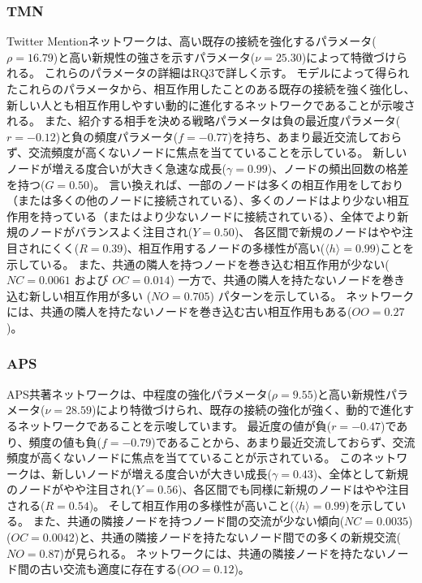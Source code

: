 \documentclass[uplatex,11pt,openany]{ujreport}
\begin{document}
            \subsubsection*{TMN}
            Twitter Mentionネットワークは、高い既存の接続を強化するパラメータ($\rho = 16.79$)と高い新規性の強さを示すパラメータ($\nu = 25.30$)によって特徴づけられる。
            これらのパラメータの詳細はRQ3で詳しく示す。
            モデルによって得られたこれらのパラメータから、相互作用したことのある既存の接続を強く強化し、新しい人とも相互作用しやすい動的に進化するネットワークであることが示唆される。
            また、紹介する相手を決める戦略パラメータは負の最近度パラメータ($r = -0.12$)と負の頻度パラメータ($f = -0.77$)を持ち、あまり最近交流しておらず、交流頻度が高くないノードに焦点を当てていることを示している。
            新しいノードが増える度合いが大きく急速な成長($\gamma = 0.99$)、ノードの頻出回数の格差を持つ($G = 0.50$)。
            言い換えれば、一部のノードは多くの相互作用をしており（または多くの他のノードに接続されている）、多くのノードはより少ない相互作用を持っている（またはより少ないノードに接続されている）、全体でより新規のノードがバランスよく注目され($Y = 0.50$)、
            各区間で新規のノードはやや注目されにくく($R = 0.39$)、相互作用するノードの多様性が高い($\langle h \rangle = 0.99$)ことを示している。
            また、共通の隣人を持つノードを巻き込む相互作用が少ない($NC = 0.0061$ および $OC = 0.014$) 一方で、共通の隣人を持たないノードを巻き込む新しい相互作用が多い ($NO = 0.705$) パターンを示している。
            ネットワークには、共通の隣人を持たないノードを巻き込む古い相互作用もある($OO = 0.27$)。

            \subsubsection*{APS}
            APS共著ネットワークは、中程度の強化パラメータ($\rho = 9.55$)と高い新規性パラメータ($\nu = 28.59$)により特徴づけられ、既存の接続の強化が強く、動的で進化するネットワークであることを示唆しています。
            最近度の値が負($r = -0.47$)であり、頻度の値も負($f = -0.79$)であることから、あまり最近交流しておらず、交流頻度が高くないノードに焦点を当てていることが示されている。
            このネットワークは、新しいノードが増える度合いが大きい成長($\gamma = 0.43$)、全体として新規のノードがやや注目され($Y = 0.56$)、各区間でも同様に新規のノードはやや注目される($R = 0.54$)。
            そして相互作用の多様性が高いこと($\langle h \rangle = 0.99$)を示している。
            また、共通の隣接ノードを持つノード間の交流が少ない傾向($NC=0.0035$)($OC=0.0042$)と、共通の隣接ノードを持たないノード間での多くの新規交流($NO = 0.87$)が見られる。
            ネットワークには、共通の隣接ノードを持たないノード間の古い交流も適度に存在する($OO = 0.12$)。
\end{document}
